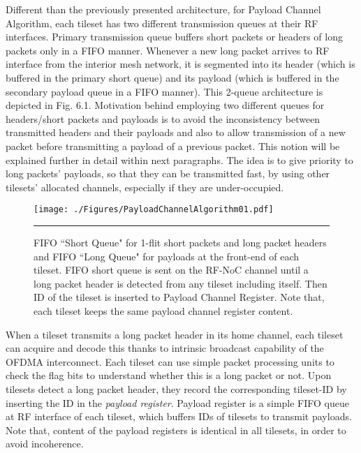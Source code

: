 Different than the previously presented architecture, for Payload Channel Algorithm, each tileset has two different transmission queues at their RF interfaces. Primary transmission queue buffers short packets or headers of long packets only in a FIFO manner. Whenever a new long packet arrives to RF interface from the interior mesh network, it is segmented into its header (which is buffered in the primary short queue) and its payload (which is buffered in the secondary payload queue in a FIFO manner). This 2-queue architecture is depicted in Fig. 6.1. Motivation behind employing two different queues for headers/short packets and payloads is to avoid the inconsistency between transmitted headers and their payloads and also to allow transmission of a new packet before transmitting a payload of a previous packet. This notion will be explained further in detail within next paragraphs. The idea is to give priority to long packets' payloads, so that they can be transmitted fast, by using other tilesets' allocated channels, especially if they are under-occupied.  


\begin{figure}[htbp]
  \centering
    \texttt{[image: ./Figures/PayloadChannelAlgorithm01.pdf]}
    \rule{35em}{0.5pt}
  \caption[Payload Channel Algorithm Tileset Front-end]{FIFO ``Short Queue" for 1-flit short packets and long packet headers and FIFO ``Long Queue" for payloads at the front-end of each tileset. FIFO short queue is sent on the RF-NoC channel until a long packet header is detected  from any tileset including itself. Then ID of the tileset is inserted to Payload Channel Register. Note that, each tileset keeps the same payload channel register content.}
  \label{fig:Electron}
\end{figure}

When a tileset transmits a long packet header in its home channel, each tileset can acquire and decode this thanks to intrinsic broadcast capability of the OFDMA interconnect. Each tileset can use simple packet processing units to check the flag bits to understand whether this is a long packet or not. Upon tilesets detect a long packet header, they record the corresponding tileset-ID by inserting the ID in the \textit{payload register}. Payload register is a simple FIFO queue at RF interface of each tileset, which buffers IDs of tilesets to transmit payloads. Note that, content of the payload registers is identical in all tilesets, in order to avoid incoherence. 

